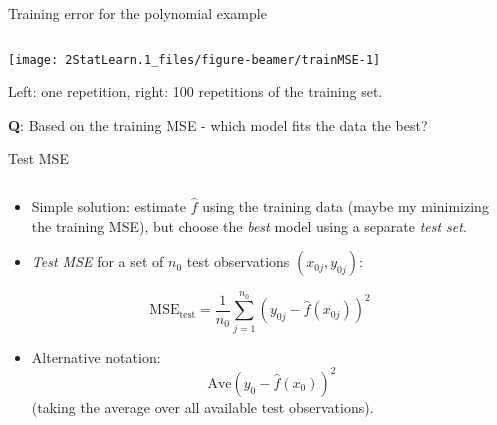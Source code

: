 \documentclass[ignorenonframetext,]{beamer}
\providecommand{\tightlist}{%
  \setlength{\itemsep}{0pt}\setlength{\parskip}{0pt}}
\begin{document}
\begin{frame}

\begin{block}{Training error for the polynomial example}

\(~\)

\begin{center}\texttt{[image: 2StatLearn.1\_files/figure-beamer/trainMSE-1]} \end{center}

\vspace{2mm}

Left: one repetition, right: 100 repetitions of the training set.

\vspace{2mm}

\textbf{Q}: Based on the training MSE - which model fits the data the
best?

\end{block}

\end{frame}

\begin{frame}

\begin{block}{Test MSE}

\(~\)

\begin{itemize}
\tightlist
\item
  Simple solution: estimate \(\hat{f}\) using the training data (maybe
  my minimizing the training MSE), but choose the \emph{best} model
  using a separate \emph{test set}.
\end{itemize}

\vspace{2mm}

\begin{itemize}
\tightlist
\item
  \emph{Test MSE} for a set of \(n_0\) test observations
  \((x_{0j},y_{0j})\):
\end{itemize}

\[ \text{MSE}_{\text{test}}=\frac{1}{n_0}\sum_{j=1}^{n_0} (y_{0j}-\hat{f}(x_{0j}))^2\]

\vspace{2mm}

\begin{itemize}
\tightlist
\item
  Alternative notation: \[\text{Ave}(y_0-\hat{f}(x_0))^2\] (taking the
  average over all available test observations).
\end{itemize}

\end{block}

\end{frame}
\end{document}
